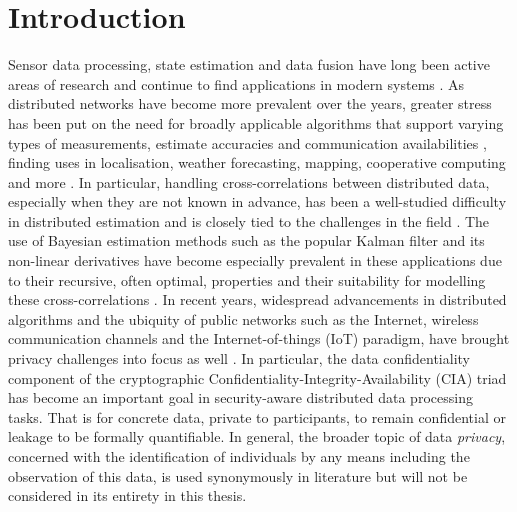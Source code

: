 
\chapter{Introduction}\label{ch:intro}
Sensor data processing, state estimation and data fusion have long been active areas of research and continue to find applications in modern systems \cite{andersonOptimalFiltering1979,simonOptimalStateEstimation2006}. As distributed networks have become more prevalent over the years, greater stress has been put on the need for broadly applicable algorithms that support varying types of measurements, estimate accuracies and communication availabilities \cite{mutambaraDecentralizedEstimationControl1998,ligginsDistributedDataFusion2012}, finding uses in localisation, weather forecasting, mapping, cooperative computing and more \cite{galanisApplicationsKalmanFilters2006,gillijnsWhatEnsembleKalman2006,geziciLocalizationUltraWidebandRadios2005,sieblerLocalizationMagneticField2020,kiaCooperativeLocalizationMobile2016,sridharCooperativePerceptionAutonomous2019,aulinasSLAMProblemSurvey2008}. In particular, handling cross-correlations between distributed data, especially when they are not known in advance, has been a well-studied difficulty in distributed estimation and is closely tied to the challenges in the field \cite{julierNondivergentEstimationAlgorithm1997,grimeDataFusionDecentralized1994,noackTreatmentDependentInformation2017,radtkeReconstructionCrossCorrelationsConstant2018}. The use of Bayesian estimation methods such as the popular Kalman filter and its non-linear derivatives have become especially prevalent in these applications due to their recursive, often optimal, properties and their suitability for modelling these cross-correlations \cite{chongFortyYearsDistributed2017,haugBayesianEstimationTracking2012,willnerKalmanFilterAlgorithms1976,pfaffInformationFormDistributed2017}. In recent years, widespread advancements in distributed algorithms and the ubiquity of public networks such as the Internet, wireless communication channels and the Internet-of-things (IoT) paradigm, have brought privacy challenges into focus as well \cite{brennerSecretProgramExecution2011,renSecurityChallengesPublic2012}. In particular, the data confidentiality component of the cryptographic Confidentiality-Integrity-Availability (CIA) triad \cite{keyserSecurityPolicy2005} has become an important goal in security-aware distributed data processing tasks. That is for concrete data, private to participants, to remain confidential or leakage to be formally quantifiable. In general, the broader topic of data \textit{privacy}, concerned with the identification of individuals by any means including the observation of this data, is used synonymously in literature \cite{farokhiPrivacyDynamicalSystems2020,specialePrivacyPreservingImageBased2019,erkinPrivacyPreservingFaceRecognition2009,hePreservingDataPrivacyAdded2018,liPrivacyPreservingDistributedOptimization2020} but will not be considered in its entirety in this thesis.

